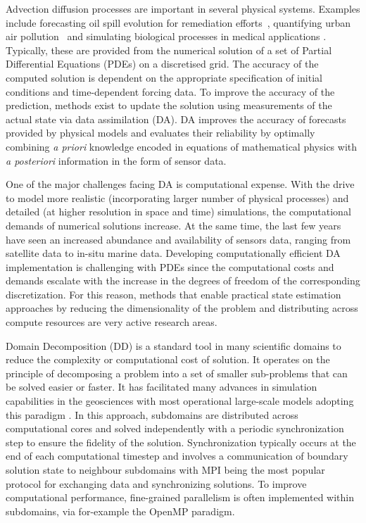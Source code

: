 \documentclass[conference,compsoc]{IEEEtran}
\begin{document}
Advection diffusion processes are important in several physical systems. Examples include forecasting oil spill evolution for remediation efforts~\cite{guo2009modeling}, quantifying urban air pollution~\cite{Stockie2011} and simulating biological processes in medical applications \cite{quarteroni2002}. Typically, these are provided from the numerical solution of a set of Partial Differential Equations (PDEs) on a discretised grid. The accuracy of the computed solution is dependent on the appropriate specification of initial conditions and time-dependent forcing data. To improve the accuracy of the prediction, methods exist to update the solution using measurements of the actual state via data assimilation (DA). DA improves the accuracy of forecasts provided by physical models and evaluates their reliability by optimally combining \emph{a priori} knowledge encoded in equations of mathematical physics with \emph{a posteriori} information in the form of sensor data. 


One of the major challenges facing DA is computational expense. With the drive to model more realistic (incorporating larger number of physical processes) and detailed (at higher resolution in space and time) simulations, the computational demands of numerical solutions increase. At the same time, the last few years have seen an increased abundance and availability of sensors data, ranging from satellite data to in-situ marine data. Developing computationally efficient DA implementation is challenging with PDEs since the computational costs and demands escalate with the increase in the degrees of freedom of the corresponding discretization. For this reason, methods that enable practical state estimation approaches by reducing the dimensionality of the problem and distributing across compute resources are very active research areas. 

Domain Decomposition (DD) is a standard tool in many scientific domains to reduce the complexity or computational cost of solution. It operates on the principle of decomposing a problem into a set of smaller sub-problems that can be solved easier or faster. It has facilitated many advances in simulation capabilities in the geosciences with most operational large-scale models adopting this paradigm \cite{michalakes2001development, hu2013scalable, hammond2014evaluating}. In this approach, subdomains are distributed across computational cores and solved independently with a periodic synchronization step to ensure the fidelity of the solution. Synchronization typically occurs at the end of each computational timestep and involves a communication of boundary solution state to neighbour subdomains with MPI being the most popular protocol for exchanging data and synchronizing solutions. To improve computational performance, fine-grained parallelism is often implemented within subdomains, via for-example the OpenMP paradigm.
\end{document}
